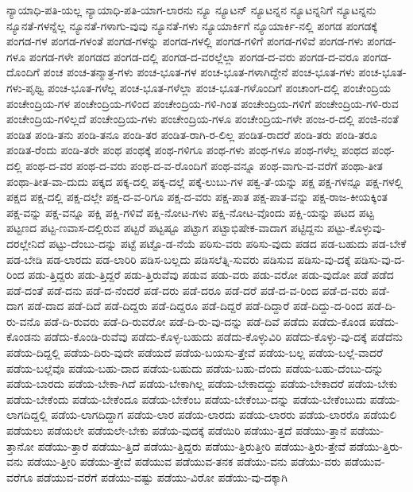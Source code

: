 {ನ್ಯಾಯಾಧಿ-ಪತಿ-ಯಲ್ಲ
ನ್ಯಾಯಾಧಿ-ಪತಿ-ಯಾಗ-ಲಾರನು
ನ್ಯೂ
ನ್ಯೂಟನ್
ನ್ಯೂಟನ್ನನ
ನ್ಯೂಟನ್ನನಿಗೆ
ನ್ಯೂಟನ್ನನು
ನ್ಯೂನತೆ-ಗಳನ್ನೆಲ್ಲ
ನ್ಯೂನತೆ-ಗಳಾಗು-ವುವು
ನ್ಯೂನತೆ-ಗಳು
ನ್ಯೂಯಾರ್ಕಿಗೆ
ನ್ಯೂಯಾರ್ಕಿ-ನಲ್ಲಿ
ಪಂಗಡ
ಪಂಗಡಕ್ಕೆ
ಪಂಗಡ-ಗಳ
ಪಂಗಡ-ಗಳಂತೆ
ಪಂಗಡ-ಗಳನ್ನು
ಪಂಗಡ-ಗಳಲ್ಲಿ
ಪಂಗಡ-ಗಳಿಗೆ
ಪಂಗಡ-ಗಳಿವೆ
ಪಂಗಡ-ಗಳು
ಪಂಗಡ-ಗಳೂ
ಪಂಗಡ-ಗಳೇ
ಪಂಗಡದ
ಪಂಗಡ-ದಲ್ಲಿ
ಪಂಗಡ-ದ-ವರಲ್ಲೆಲ್ಲಾ
ಪಂಗಡ-ದ-ವರು
ಪಂಗಡ-ದ-ವರೂ
ಪಂಗಡ-ದೊಂದಿಗೆ
ಪಂಚ
ಪಂಚ-ತನ್ಮಾತ್ರ-ಗಳು
ಪಂಚ-ಭೂತ-ಗಳ
ಪಂಚ-ಭೂತ-ಗಳಾಗಿದ್ದೇನೆ
ಪಂಚ-ಭೂತ-ಗಳು
ಪಂಚ-ಭೂತ-ಗಳು-ಪೃಥ್ವಿ
ಪಂಚ-ಭೂತ-ಗಳೆಲ್ಲ
ಪಂಚ-ಭೂತ-ಗಳೆಲ್ಲಾ
ಪಂಚ-ಭೂತ-ಗಳೊಂದಿಗೆ
ಪಂಚಾಂಗ-ದಲ್ಲಿ
ಪಂಚೇಂದ್ರಿಯ
ಪಂಚೇಂದ್ರಿಯ-ಗಳ
ಪಂಚೇಂದ್ರಿಯ-ಗಳಿಂದ
ಪಂಚೇಂದ್ರಿಯ-ಗಳಿ-ಗಿಂತ
ಪಂಚೇಂದ್ರಿಯ-ಗಳಿಗೆ
ಪಂಚೇಂದ್ರಿಯ-ಗಳಿ-ರುವ
ಪಂಚೇಂದ್ರಿಯ-ಗಳಿಲ್ಲದೆ
ಪಂಚೇಂದ್ರಿಯ-ಗಳು
ಪಂಚೇಂದ್ರಿಯ-ಗಳೂ
ಪಂಚೇಂದ್ರಿಯ-ಗಳೇ
ಪಂಜ-ರ-ದಲ್ಲಿ
ಪಂಜಿ-ನಂತೆ
ಪಂಡಿತ
ಪಂಡಿ-ತನು
ಪಂಡಿ-ತನೂ
ಪಂಡಿ-ತರ
ಪಂಡಿತ-ರಾಗಿ-ರ-ಲಿಲ್ಲ
ಪಂಡಿತ-ರಾದರೆ
ಪಂಡಿ-ತರು
ಪಂಡಿ-ತರೂ
ಪಂಡಿತ-ರೆಂದು
ಪಂಡಿ-ತರೇ
ಪಂಥ
ಪಂಥಕ್ಕೆ
ಪಂಥ-ಗಳಿಗೂ
ಪಂಥ-ಗಳು
ಪಂಥ-ಗಳೂ
ಪಂಥ-ಗಳೆಲ್ಲ
ಪಂಥದ
ಪಂಥ-ದಲ್ಲಿ
ಪಂಥ-ದ-ವರ
ಪಂಥ-ದ-ವರು
ಪಂಥ-ದ-ವ-ರೊಂದಿಗೆ
ಪಂಥ-ವನ್ನೂ
ಪಂಥ-ವಾಗು-ವ-ವರೆಗೆ
ಪಂಥಾ-ತೀತ
ಪಂಥಾ-ತೀತ-ವಾ-ದುದು
ಪಕ್ಕದ
ಪಕ್ಕ-ದಲ್ಲಿ
ಪಕ್ಕ-ದಲ್ಲೆ
ಪಕ್ಕೆ-ಲುಬು-ಗಳ
ಪಕ್ವ-ತೆ-ಯನ್ನು
ಪಕ್ಷ
ಪಕ್ಷ-ಗಳನ್ನೂ
ಪಕ್ಷ-ಗಳಲ್ಲಿ
ಪಕ್ಷದ
ಪಕ್ಷ-ದಲ್ಲಿ
ಪಕ್ಷ-ದಲ್ಲೇ
ಪಕ್ಷ-ದ-ವ-ರಿಗೂ
ಪಕ್ಷ-ದ-ವರು
ಪಕ್ಷ-ಪಾತ
ಪಕ್ಷ-ಪಾತ-ವನ್ನು
ಪಕ್ಷ-ರಾಜ-ಕೀಯಕ್ಕಿಂತ
ಪಕ್ಷ-ವನ್ನು
ಪಕ್ಷ-ವನ್ನೂ
ಪಕ್ಷಿ
ಪಕ್ಷಿ-ಗಳಿವೆ
ಪಕ್ಷಿ-ನೋಟ-ಗಳು
ಪಕ್ಷಿ-ನೋಟ-ವೊಂದು
ಪಕ್ಷಿ-ಯನ್ನು
ಪಟದ
ಪಟ್ಟ
ಪಟ್ಟಣದ
ಪಟ್ಟ-ಣವಾಸ-ದಲ್ಲಿರುವ
ಪಟ್ಟರೆ
ಪಟ್ಟಷ್ಟೂ
ಪಟ್ಟಾಗ
ಪಟ್ಟಾಭಿಷೇಕ-ವಾದಾಗ
ಪಟ್ಟಿದ್ದನು
ಪಟ್ಟು-ಕೊಳ್ಳುವು-ದರಲ್ಲೇನಿದೆ
ಪಟ್ಟು-ದೆಂಬು-ದನ್ನು
ಪಟ್ಟೆ
ಪಟ್ಟೊ-ಡ-ನೆಯೆ
ಪಠಿಸು-ವರು
ಪಠಿಸು-ವುದು
ಪಡದ
ಪಡ-ಬಹುದು
ಪಡ-ಬೇಕೆ
ಪಡ-ಬೇಡಿ
ಪಡ-ಲಾರದು
ಪಡ-ಲಾರಿರಿ
ಪಡಿಸ-ಬಲ್ಲದು
ಪಡಿಸಲೆತ್ನಿ-ಸುವರು
ಪಡಿಸುವ
ಪಡಿಸು-ವು-ದಕ್ಕೆ
ಪಡಿಸು-ವು-ದ-ರಿಂದ
ಪಡು-ತ್ತಿದ್ದರು
ಪಡು-ತ್ತಿದ್ದರೆ
ಪಡು-ತ್ತಿರುವೆವು
ಪಡುವ
ಪಡು-ವರು
ಪಡು-ವರೋ
ಪಡು-ವುದೋ
ಪಡೆ
ಪಡೆದ
ಪಡೆ-ದಂತೆ
ಪಡೆ-ದನು
ಪಡೆ-ದ-ನೆಂದರೆ
ಪಡೆ-ದರು
ಪಡೆ-ದರೂ
ಪಡೆ-ದರೆ
ಪಡೆ-ದ-ವ-ರಿಂದ
ಪಡೆ-ದ-ವರು
ಪಡೆ-ದಾಗ
ಪಡೆ-ದಾದ
ಪಡೆ-ದಿದೆ
ಪಡೆ-ದಿದ್ದರು
ಪಡೆ-ದಿದ್ದರೂ
ಪಡೆ-ದಿದ್ದರೆ
ಪಡೆ-ದಿದ್ದಾರೆ
ಪಡೆ-ದಿದ್ದು-ದ-ರಿಂದ
ಪಡೆ-ದಿ-ರು-ವನೊ
ಪಡೆ-ದಿ-ರುವರು
ಪಡೆ-ದಿ-ರುವರೋ
ಪಡೆ-ದಿ-ರು-ವು-ದನ್ನು
ಪಡೆ-ದಿವೆ
ಪಡೆದು
ಪಡೆದು-ಕೊಂಡ
ಪಡೆದು-ಕೊಂಡನು
ಪಡೆದು-ಕೊಂಡಿ-ರುವೆವು
ಪಡೆದು-ಕೊಳ್ಳ-ಬಹುದು
ಪಡೆದು-ಕೊಳ್ಳುವಿರಿ
ಪಡೆದು-ಕೊಳ್ಳು-ವು-ದಕ್ಕೆ
ಪಡೆದೆನು
ಪಡೆಯ-ದಿದ್ದಲ್ಲಿ
ಪಡೆಯ-ದಿರು-ವುದೇ
ಪಡೆಯದೆ
ಪಡೆಯ-ಬಯಸು-ತ್ತೇವೆ
ಪಡೆಯ-ಬಲ್ಲ
ಪಡೆಯ-ಬಲ್ಲೆ-ವಾದರೆ
ಪಡೆಯ-ಬಲ್ಲೆವೊ
ಪಡೆಯ-ಬಹು-ದಾದ
ಪಡೆಯ-ಬಹುದು
ಪಡೆಯ-ಬಹು-ದೆಂದು
ಪಡೆಯ-ಬಹು-ದೆಂಬು-ದನ್ನು
ಪಡೆಯ-ಬಾರದು
ಪಡೆಯ-ಬೇಕಾ-ಗಿದೆ
ಪಡೆಯ-ಬೇಕಾಗಿಲ್ಲ
ಪಡೆಯ-ಬೇಕಾದದ್ದು
ಪಡೆಯ-ಬೇಕಾದರೆ
ಪಡೆಯ-ಬೇಕು
ಪಡೆಯ-ಬೇಕೆಂದು
ಪಡೆಯ-ಬೇಕೆಂದೂ
ಪಡೆಯ-ಬೇಕೆಂಬ
ಪಡೆಯ-ಬೇಕೆಂಬು-ದನ್ನು
ಪಡೆಯ-ಬೇಕೆಂಬುದು
ಪಡೆಯ-ಲಾಗದಿದ್ದಲ್ಲಿ
ಪಡೆಯ-ಲಾಗದಿದ್ದಾಗ
ಪಡೆಯ-ಲಾರ
ಪಡೆಯ-ಲಾರದು
ಪಡೆಯ-ಲಾರರು
ಪಡೆಯ-ಲಾರರೊ
ಪಡೆಯಲಿ
ಪಡೆಯಲು
ಪಡೆಯಲೇ
ಪಡೆಯಲೇ-ಬೇಕು
ಪಡೆಯ-ವುದಕ್ಕೆ
ಪಡೆಯಿರಿ
ಪಡೆಯು-ತ್ತದೆ
ಪಡೆಯು-ತ್ತಾನೆ
ಪಡೆಯು-ತ್ತಾನೋ
ಪಡೆಯು-ತ್ತಾರೆ
ಪಡೆಯು-ತ್ತಿದೆ
ಪಡೆಯು-ತ್ತಿದ್ದರು
ಪಡೆಯು-ತ್ತಿರುತ್ತೀರಿ
ಪಡೆಯು-ತ್ತಿರು-ತ್ತೇವೆ
ಪಡೆಯು-ತ್ತಿರು-ವನು
ಪಡೆಯು-ತ್ತೀರಿ
ಪಡೆಯು-ತ್ತೇವೆ
ಪಡೆಯುವ
ಪಡೆಯುವ-ತನಕ
ಪಡೆಯು-ವನು
ಪಡೆಯು-ವರು
ಪಡೆಯುವ-ವರೆಗೂ
ಪಡೆಯುವ-ವರೆಗೆ
ಪಡೆಯು-ವಷ್ಟು
ಪಡೆಯು-ವಿರೋ
ಪಡೆಯು-ವು-ದಕ್ಕಾಗಿ
}
